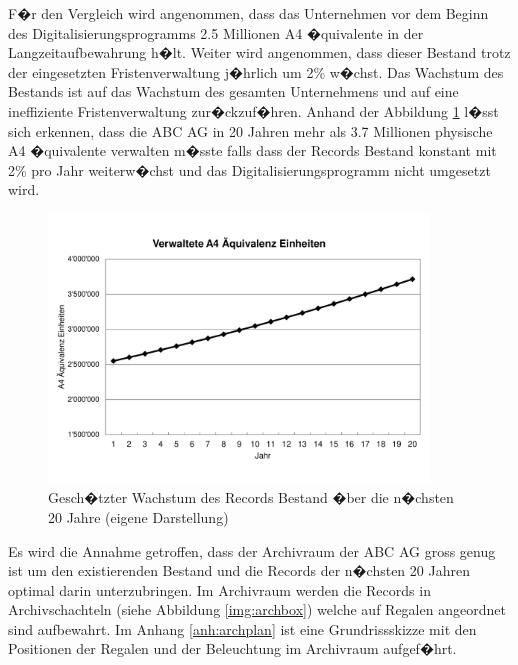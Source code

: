 \documentclass[a4paper,twoside,10pt]{report}
\begin{document}
F�r den Vergleich wird angenommen, dass das Unternehmen vor dem Beginn des Digitalisierungsprogramms 2.5 Millionen A4 �quivalente in der Langzeitaufbewahrung h�lt. Weiter wird angenommen, dass dieser Bestand trotz der eingesetzten Fristenverwaltung j�hrlich um 2\% w�chst. Das Wachstum des Bestands ist auf das Wachstum des gesamten Unternehmens und auf eine ineffiziente Fristenverwaltung zur�ckzuf�hren. Anhand der Abbildung \ref{img:arch_wachstum} l�sst sich erkennen, dass die ABC AG in 20 Jahren mehr als 3.7 Millionen physische A4 �quivalente verwalten m�sste falls dass der Records Bestand konstant mit 2\% pro Jahr weiterw�chst und das Digitalisierungsprogramm nicht umgesetzt wird.

\begin{figure}[htb]%
\centering
\includegraphics[width=0.9\textwidth]{archiv_wachstum.pdf}%
\caption{Gesch�tzter Wachstum des Records Bestand �ber die n�chsten 20 Jahre (eigene Darstellung)}%
\label{img:arch_wachstum}%
\end{figure}

Es wird die Annahme getroffen, dass der Archivraum der ABC AG gross genug ist um den existierenden Bestand und die Records der n�chsten 20 Jahren optimal darin unterzubringen. Im Archivraum werden die Records in Archivschachteln (siehe Abbildung \ref{img:archbox}) welche auf Regalen angeordnet sind aufbewahrt. Im Anhang \ref{anh:archplan} ist eine Grundrissskizze mit den Positionen der Regalen und der Beleuchtung im Archivraum aufgef�hrt.
\end{document}
